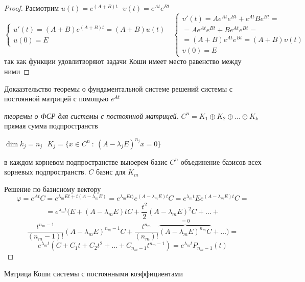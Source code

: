 \begin{block}[Свойства]
\begin{proof}
    Расмотрим $u(t) = e^{(A+B)t} ~~~ \upsilon(t) = e^{At}e^{Bt}$
    $$
    \left\{
    \begin{array}{l}
      u'(t) = (A+B) e^{(A+B)t} = (A+B)u(t) \\
      u(0) = E
    \end{array}
    \right. ~~~
    \left\{
    \begin{array}{l}
      \upsilon'(t) = A e^{At} e^{Bt} + e^{At} B e^{Bt} = \\
      = A e^{At} e^{Bt} + B e^{At} e^{Bt} = \\
      = (A+B) e^{At} e^{Bt} =(A+B)\upsilon(t) \\
      \upsilon(0) = E
    \end{array}
    \right.
    $$
    так как функции удовлитворяют задачи Коши имеет место равенство между ними
  \end{proof}
\end{block}

\begin{title}[\Large]
  Докаазтельство теоремы о фундаментальной системе решений системы с постоянной
  матрицей с помощью $e^{At}$
\end{title}

\begin{proof}[теоремы о ФСР для системы с постоянной матрицей]
  $C^n = K_1 \oplus K_2 \oplus \ldots \oplus K_k$ прямая сумма подпространств

  $\dim k_j = n_j ~~~ K_j = \{x \in C^n ~:~ (A - \lambda_jE)^{n_j}x = 0\}$

  в каждом корневом подпространстве выюерем базис $C^n$ объединение базисов всех
  корневых подпространств. $C$ базис для $K_m$

  Решение по базисному вектору
  $$
  \varphi = e^{At} C = e^{\lambda_m Et + t(A - \lambda_m E)} = e^{\lambda_mEt)}
  e^{(A - \lambda_mE)t}C = e^{\lambda_mt} E e^{(A - \lambda_mE)t}C =
  $$
  $$
  = e^{\lambda_m t}(E + (A-\lambda_m E)t C + \frac{t^2}{2}(A-\lambda_mE)^2C
  + \ldots +
  $$
  $$
  \frac{t^{n_m -1}}{(n_m-1)!}(A-\lambda_mE)^{n_m -1}C +
  \frac{t^{n_m}}{(n_m)!}\overbrace{(A - \lambda_m E)^{n_m}C}^{=0} + \ldots ) =
  $$
  $$
  e^{\lambda_m t}(C + C_1 t + C_2 t^2 + \ldots + C_{n_m-1}t^{n_m-1}) =
  e^{\lambda_m t} P_{n_m-1}(t)
  $$
\end{proof}

\begin{title}[\Large]
  Матрица Коши системы с постоянными коэффициентами
\end{title}

